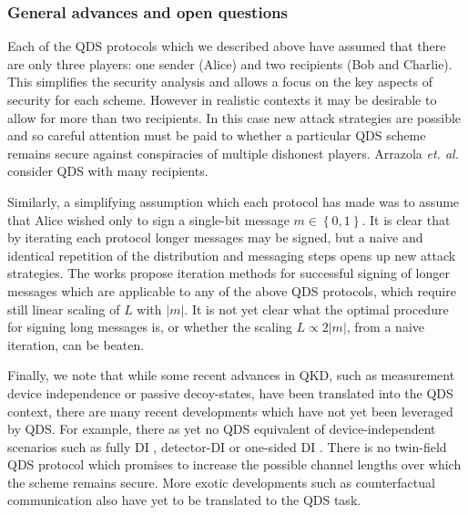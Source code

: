 \subsubsection*{General advances and open questions}
Each of the QDS protocols which we described above have assumed that there are only three players: one sender (Alice) and two recipients (Bob and Charlie). This simplifies the security analysis and allows a focus on the key aspects of security for each scheme. However in realistic contexts it may be desirable to allow for more than two recipients. In this case new attack strategies are possible and so careful attention must be paid to whether a particular QDS scheme remains secure against conspiracies of multiple dishonest players. Arrazola \emph{et. al.} \cite{Arrazola2015} consider QDS with many recipients. %

Similarly, a simplifying assumption which each protocol has made was to assume that Alice wished only to sign a single-bit message $m \in \left\{0, 1\right\}$. It is clear that by iterating each protocol longer messages may be signed, but a naive and identical repetition of the distribution and messaging steps opens up new attack strategies. The works \cite{Wang2015, Wang2017} propose iteration methods for successful signing of longer messages which are applicable to any of the above QDS protocols, which require still linear scaling of $L$ with $\left|m\right|$. It is not yet clear what the optimal procedure for signing long messages is, or whether the scaling $L \propto 2 \left|m\right|$, from a naive iteration, can be beaten. 

Finally, we note that while some recent advances in QKD, such as measurement device independence or passive decoy-states, have been translated into the QDS context, there are many recent developments which have not yet been leveraged by QDS. For example, there as yet no QDS equivalent of device-independent scenarios such as fully DI \cite{Vazirani2014}, detector-DI \cite{Lim2014a} or one-sided DI \cite{Walk2016a}. There is no twin-field \cite{Curty2018} QDS protocol which promises to increase the possible channel lengths over which the scheme remains secure. More exotic developments such as counterfactual communication \cite{Noh2009, Salih2013a, Hance2019, Vaidman2019} also have yet to be translated to the QDS task. 

